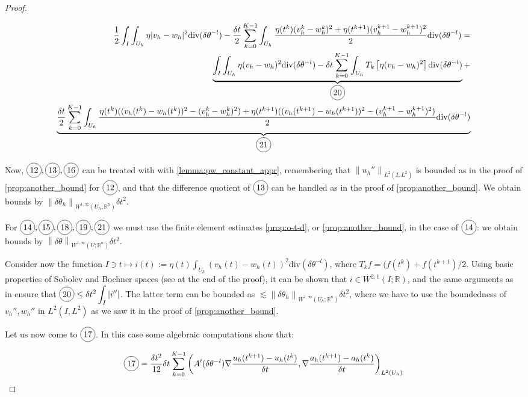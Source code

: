 \documentclass[english,a4paper,9pt,oneside]{scrbook}	%
\theoremstyle{break}
\newenvironment{mproof}[1][\proofname]{%
  \begin{proof}[#1]$ $\par\nobreak\ignorespaces
}{%
  \end{proof}
}
\renewcommand*{\proofname}{Proof}
\theoremstyle{remark}
\newcommand{\mR}{\mathbb{R}}
\newcommand{\ds}{\displaystyle}
\newcommand{\norm}[1]{\left\lVert#1\right\rVert}
\newcommand{\te}{\theta}
\newcommand{\dive}{\text{div}}
\newcommand*\circled[1]{\tikz[baseline=(char.base)]{
            \node[shape=circle,draw,inner sep=2pt] (char) {#1};}}
\begin{document}
\begin{mproof}
\begin{align*}
\frac{1}{2} \int_I \int_{U_h} \eta |v_h-w_h|^2\dive(\delta \te^{-l}) - \frac{\delta t}{2} \sum_{k=0}^{K-1} \int_{U_h}\frac{\eta(t^k)(v_h^k-w_h^k)^2 + \eta(t^{k+1})(v_h^{k+1}-w_h^{k+1})^2}{2}\dive(\delta \te^{-l}) = \\
\underbrace{\int_I \int_{U_h}\eta(v_h-w_h)^2\dive(\delta \te^{-l}) - \delta t \sum_{k=0}^{K-1}\int_{U_h} T_k \left [ \eta(v_h-w_h)^2 \right] \dive(\delta \te^{-l})}_{\circled{20}} +\\
\underbrace{\frac{\delta t}{2} \sum_{k=0}^{K-1} \int_{U_h}\frac{\eta(t^k)((v_h(t^k)-w_h(t^k))^2- (v_h^k-w_h^k)^2) + \eta(t^{k+1})((v_h(t^{k+1})-w_h(t^{k+1}))^2 -(v_h^{k+1}-w_h^{k+1})^2)}{2}\dive(\delta \te^{-l})}_{\circled{21}}
\end{align*}

Now, $\circled{12}, \circled{13}, \circled{16}$ can be treated with with \cref{lemma:pw_constant_appr}, remembering that $\norm{u_h''}_{L^2(I,L^2)}$ is bounded as in the proof of \cref{prop:another_bound} for $\circled{12}$, and that the difference quotient of $\circled{13}$ can be handled as in the proof of \cref{prop:another_bound}. We obtain bounds by $ \norm{\delta \te_h}_{W^{1,\infty}(U_h;\mR^n)} \delta t^2$.

For $\circled{14}, \circled{15}, \circled{18}, \circled{19}, \circled{21}$ we must use the finite element estimates \ref{prop:o-t-d}, or \cref{prop:another_bound}, in the case of $\circled{14}$: we obtain bounds by $ \norm{\delta \te}_{W^{1,\infty}(U;\mR^n)} \delta t^2$.

Consider now the function $I \ni t \mapsto \ds i(t):= \eta(t)\int_{U_h}(v_h(t)-w_h(t))^2\dive(\delta \te^{-l})$, where $T_k f = (f(t^k)+f(t^{k+1})/2$. Using basic properties of Sobolev and Bochner spaces (see at the end of the proof), it can be shown that $i \in W^{2,1}(I; \mR)$, and the same arguments as in \cite{trapezoidal} ensure that $\ds\circled{20} \leq \delta t^2 \int_I |i''|$. The latter term can be bounded as $\lesssim \norm{\delta \te_h}_{W^{1,\infty}(U_h;\mR^n)} \delta t^2$, where we have to use the boundedness of $v_h'', w_h''$ in $L^2(I,L^2)$ as we saw it in the proof of \cref{prop:another_bound}.

Let us now come to $\circled{17}$. In this case some algebraic computations show that:

\begin{align*}
\circled{17} = \frac{\delta t^2}{12} \delta t \sum_{k=0}^{K-1} \left ( A'(\delta \te^{-l}) \nabla \frac{u_h(t^{k+1})-u_h(t^{k})}{\delta t}, \nabla  \frac{a_h(t^{k+1})-a_h(t^{k})}{\delta t} \right )_{L^2(U_h)}
\end{align*}


\end{mproof}
\end{document}
